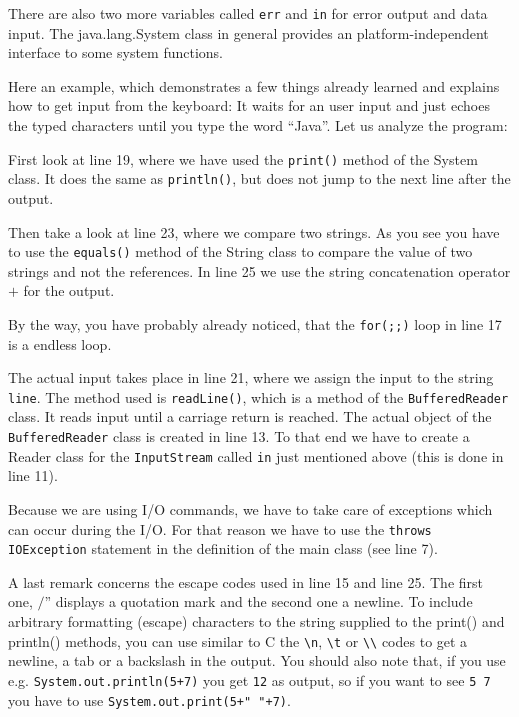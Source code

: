 There are also two more variables called \verb|err| and
\verb|in| for error output and data input. 
The java.lang.System class in general provides an platform-independent 
interface to some system functions.

Here an example, which demonstrates a few things already learned and
explains how to get input from the keyboard:
It waits for an user input and just echoes the typed characters
until you type the word ``Java''. Let us analyze the program:

First look at line 19, where we have used the \verb|print()| method
of the System class. It does the same as \verb|println()|, but does not
jump to the next line after the output.

Then take a look at line 23, where we compare two strings. As you see
you have to use the \verb|equals()| method of the String class to
compare the value of two strings and not the references. 
In line 25 we use the string concatenation operator $+$ for the output.

By the way, you have probably already noticed, that 
the \verb|for(;;)| loop in line 17 is a endless loop.

The actual input takes place in line 21, where we assign the input
to the string \verb|line|. The method used is \verb|readLine()|, which
is a method of the \verb|BufferedReader| class. It reads input until
a carriage return is reached. The actual object of the 
\verb|BufferedReader| class is created in line 13. To that end we have
to create a Reader class for the \verb|InputStream| called \verb|in|
just mentioned above (this is done in line 11).

Because we are using I/O commands, we have to take care of exceptions
which can occur during the I/O. For that reason we have to use the
\verb|throws IOException| statement in the definition of the main
class (see line 7).

A last remark concerns the escape codes used in line 15 and line 25.
The first one, $/$'' displays a quotation mark and the second
one a newline.
To include arbitrary formatting (escape) characters
to the string supplied to the print() and println() methods, you
can use similar to C the \verb|\n|, \verb|\t| or \verb|\\| codes
to get a newline, a tab or a backslash in the output. You should 
also note that, if you use e.g. \verb|System.out.println(5+7)| you
get \verb|12| as output, so if you want to see \verb|5 7| you have
to use \verb|System.out.print(5+" "+7)|.

